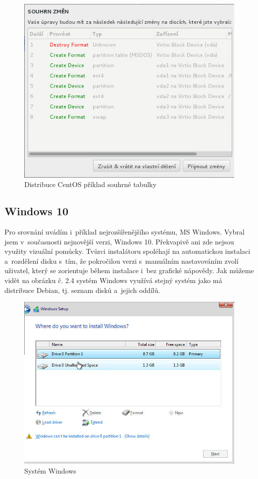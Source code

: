 \documentclass[color,table,oneside,nolot,nolof]{fithesis}
\begin{document}
\begin{figure}[h!]
	\label{fig:centos2}
	\caption{Distribuce CentOS příklad souhrné tabulky}
	\centering
	\includegraphics[width=.8\columnwidth]{pictures/centos3.jpg}
\end{figure}

\pagebreak
\subsection{Windows 10}

	Pro srovnání uvádím i~příklad nejrozšířenějšího systému, MS Windows. Vybral jsem v~současnosti nejnovější verzi, Windows 10. Překvapivě ani zde nejsou využity vizuální pomůcky\cite{windows}.
	Tvůrci instalátoru spoléhají na automatickou instalaci a~rozdělení disku s~tím, že pokročilou verzi s~manuálním nastavováním zvolí uživatel, který se zorientuje během instalace i~bez grafické nápovědy. 
	Jak můžeme vidět na obrázku č. 2.4 systém Windows využívá stejný systém jako má distribuce Debian, tj. seznam disků a~jejich oddílů.

\begin{figure}[h!]
	\label{fig:win}
	\caption{Systém Windows}
	\centering
	\includegraphics[width=.8\columnwidth]{pictures/win1.jpg}
\end{figure}
\end{document}
